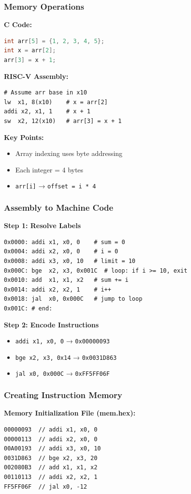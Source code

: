 \documentclass[aspectratio=169,xcolor=dvipsnames]{beamer}
\begin{document}
\begin{frame}[fragile]
\frametitle{Memory Operations}
\begin{multicols}{2}
\textbf{C Code:}
\begin{lstlisting}[language=C]
int arr[5] = {1, 2, 3, 4, 5};
int x = arr[2];
arr[3] = x + 1;
\end{lstlisting}

\columnbreak

\textbf{RISC-V Assembly:}
\begin{lstlisting}[language={}]
# Assume arr base in x10
lw  x1, 8(x10)    # x = arr[2]
addi x2, x1, 1    # x + 1
sw  x2, 12(x10)   # arr[3] = x + 1
\end{lstlisting}
\end{multicols}

\vspace{1em}
\textbf{Key Points:}
\begin{itemize}
    \item Array indexing uses byte addressing
    \item Each integer = 4 bytes
    \item \texttt{arr[i]} → \texttt{offset = i * 4}
\end{itemize}
\end{frame}

\begin{frame}[fragile]
\frametitle{Assembly to Machine Code}
\textbf{Step 1: Resolve Labels}
\begin{lstlisting}[language={}]
0x0000: addi x1, x0, 0    # sum = 0
0x0004: addi x2, x0, 0    # i = 0
0x0008: addi x3, x0, 10   # limit = 10
0x000C: bge  x2, x3, 0x001C  # loop: if i >= 10, exit
0x0010: add  x1, x1, x2   # sum += i
0x0014: addi x2, x2, 1    # i++
0x0018: jal  x0, 0x000C   # jump to loop
0x001C: # end:
\end{lstlisting}

\textbf{Step 2: Encode Instructions}
\begin{itemize}
    \item \texttt{addi x1, x0, 0} → \texttt{0x00000093}
    \item \texttt{bge x2, x3, 0x14} → \texttt{0x0031D863}
    \item \texttt{jal x0, 0x000C} → \texttt{0xFF5FF06F}
\end{itemize}
\end{frame}

\begin{frame}[fragile]
\frametitle{Creating Instruction Memory}
\textbf{Memory Initialization File (mem.hex):}
\begin{lstlisting}[language={}]
00000093  // addi x1, x0, 0
00000113  // addi x2, x0, 0
00A00193  // addi x3, x0, 10
0031D863  // bge x2, x3, 20
002080B3  // add x1, x1, x2
00110113  // addi x2, x2, 1
FF5FF06F  // jal x0, -12
\end{lstlisting}

\end{frame}
\end{document}
